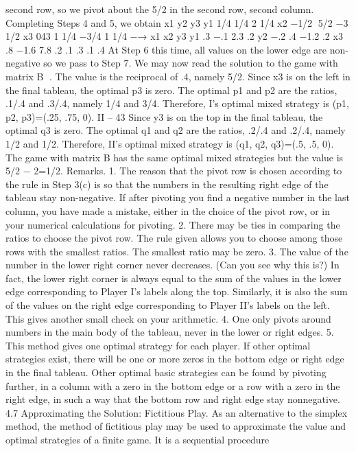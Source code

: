 \documentclass[]{report}
\begin{document}
second row, so we pivot about the 5/2 in the second row, second column. Completing
Steps 4 and 5, we obtain
x1 y2 y3
y1 1/4 1/4 2 1/4
x2 −1/2 5/2 −3 1/2
x3 043 1
1/4 −3/4 1 1/4
−→
x1 x2 y3
y1 .3 −.1 2.3 .2
y2 −.2 .4 −1.2 .2
x3 .8 −1.6 7.8 .2
.1 .3 .1 .4
At Step 6 this time, all values on the lower edge are non-negative so we pass to Step
7. We may now read the solution to the game with matrix B
.
The value is the reciprocal of .4, namely 5/2.
Since x3 is on the left in the final tableau, the optimal p3 is zero. The optimal p1
and p2 are the ratios, .1/.4 and .3/.4, namely 1/4 and 3/4. Therefore, I’s optimal mixed
strategy is (p1, p2, p3)=(.25, .75, 0).
II – 43
Since y3 is on the top in the final tableau, the optimal q3 is zero. The optimal q1
and q2 are the ratios, .2/.4 and .2/.4, namely 1/2 and 1/2. Therefore, II’s optimal mixed
strategy is (q1, q2, q3)=(.5, .5, 0).
The game with matrix B has the same optimal mixed strategies but the value is
5/2 − 2=1/2.
Remarks. 1. The reason that the pivot row is chosen according to the rule in Step
3(c) is so that the numbers in the resulting right edge of the tableau stay non-negative. If
after pivoting you find a negative number in the last column, you have made a mistake,
either in the choice of the pivot row, or in your numerical calculations for pivoting.
2. There may be ties in comparing the ratios to choose the pivot row. The rule given
allows you to choose among those rows with the smallest ratios. The smallest ratio may
be zero.
3. The value of the number in the lower right corner never decreases. (Can you see
why this is?) In fact, the lower right corner is always equal to the sum of the values in the
lower edge corresponding to Player I’s labels along the top. Similarly, it is also the sum
of the values on the right edge corresponding to Player II’s labels on the left. This gives
another small check on your arithmetic.
4. One only pivots around numbers in the main body of the tableau, never in the
lower or right edges.
5. This method gives one optimal strategy for each player. If other optimal strategies
exist, there will be one or more zeros in the bottom edge or right edge in the final tableau.
Other optimal basic strategies can be found by pivoting further, in a column with a zero
in the bottom edge or a row with a zero in the right edge, in such a way that the bottom
row and right edge stay nonnegative.
4.7 Approximating the Solution: Fictitious Play.
As an alternative to the simplex method, the method of fictitious play may be used to
approximate the value and optimal strategies of a finite game. It is a sequential procedure
\end{document}
